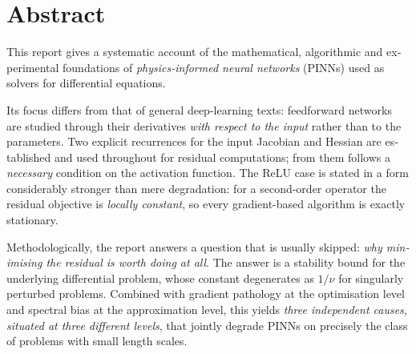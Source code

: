 \chapter*{Abstract}

\begin{english}
This report gives a systematic account of the mathematical, algorithmic and
experimental foundations of \emph{physics-informed neural networks} (PINNs) used
as solvers for differential equations.

Its focus differs from that of general deep-learning texts: feedforward networks
are studied through their derivatives \emph{with respect to the input} rather
than to the parameters. Two explicit recurrences for the input Jacobian and
Hessian are established and used throughout for residual computations; from them
follows a \emph{necessary} condition on the activation function. The ReLU case is
stated in a form considerably stronger than mere degradation: for a second-order
operator the residual objective is \emph{locally constant}, so every
gradient-based algorithm is exactly stationary.

Methodologically, the report answers a question that is usually skipped: \emph{why
minimising the residual is worth doing at all}. The answer is a stability bound
for the underlying differential problem, whose constant degenerates as $1/\nu$ for
singularly perturbed problems. Combined with gradient pathology at the
optimisation level and spectral bias at the approximation level, this yields
\emph{three independent causes, situated at three different levels}, that jointly
degrade PINNs on precisely the class of problems with small length scales.


\end{english}
